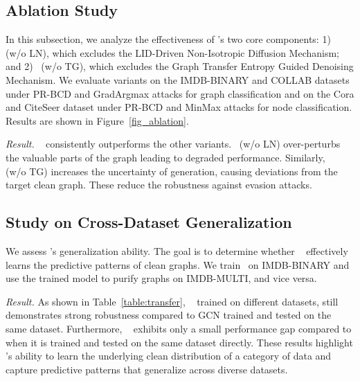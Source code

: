 
\vspace{-0.5em}

\subsection{Ablation Study}
In this subsection, we analyze the effectiveness of \ModelName's two core components: 1) \ModelName~ (w/o LN), which excludes the LID-Driven Non-Isotropic Diffusion Mechanism; and 2) \ModelName\ (w/o TG), which excludes the Graph Transfer Entropy Guided Denoising Mechanism. We evaluate variants on the IMDB-BINARY and COLLAB datasets under PR-BCD and GradArgmax attacks for graph classification and on the Cora and CiteSeer dataset under PR-BCD and MinMax attacks for node classification. Results are shown in Figure~\ref{fig_ablation}.

\textit{Result.} \ModelName~ consistently outperforms the other variants. \ModelName\ (w/o LN) over-perturbs the valuable parts of the graph leading to degraded performance. Similarly, \ModelName~ (w/o TG) increases the uncertainty of generation, causing deviations from the target clean graph. These reduce the robustness against evasion attacks.

\vspace{-1em}
\subsection{Study on Cross-Dataset Generalization}
We assess \ModelName's generalization ability. The goal is to determine whether \ModelName~ effectively learns the predictive patterns of clean graphs. We train \ModelName\ on IMDB-BINARY and use the trained model to purify graphs on IMDB-MULTI, and vice versa.

\textit{Result.} As shown in Table~\ref{table:transfer}, \ModelName~ trained on different datasets, still demonstrates strong robustness compared to GCN trained and tested on the same dataset. Furthermore, \ModelName~ exhibits only a small performance gap compared to when it is trained and tested on the same dataset directly.
These results highlight \ModelName's ability to learn the underlying clean distribution of a category of data and capture predictive patterns that generalize across diverse datasets.

